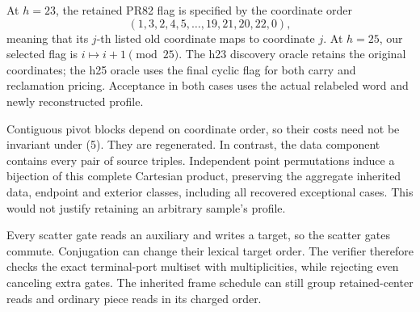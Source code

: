 \documentclass[11pt]{article}
\begin{document}
At \(h=23\), the retained PR82 flag is specified by the coordinate order
\[
 (1,3,2,4,5,\ldots,19,21,20,22,0),
\]
meaning that its \(j\)-th listed old coordinate maps to coordinate \(j\).
At \(h=25\), our selected flag is \(i\mapsto i+1\pmod {25}\).
The h23 discovery oracle retains the original coordinates; the h25 oracle
uses the final cyclic flag for both carry and reclamation pricing. Acceptance
in both cases uses the actual relabeled word and newly reconstructed profile.

Contiguous pivot blocks depend on coordinate order, so their costs need not
be invariant under (5). They are regenerated. In contrast, the data component
contains every pair of source triples. Independent point permutations induce
a bijection of this complete Cartesian product, preserving the aggregate
inherited data, endpoint and exterior classes, including all recovered
exceptional cases. This would not justify retaining an arbitrary sample's
profile.

Every scatter gate reads an auxiliary and writes a target, so the scatter
gates commute. Conjugation can change their lexical target order. The verifier
therefore checks the exact terminal-port multiset with multiplicities, while
rejecting even canceling extra gates. The inherited frame schedule can still
group retained-center reads and ordinary piece reads in its charged order.
\end{document}

